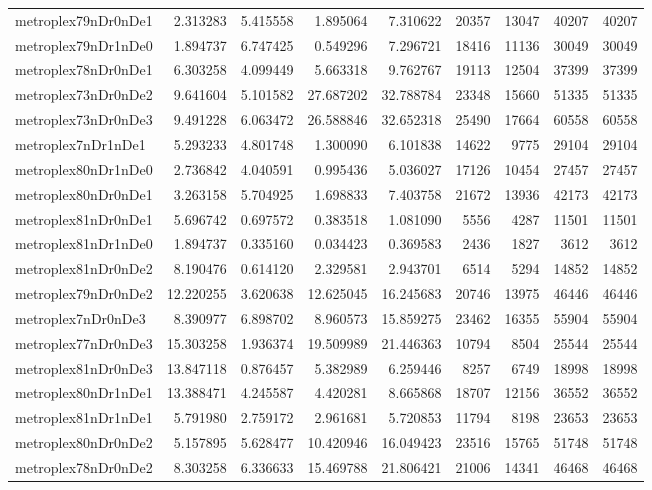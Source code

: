 \begin{longtable}{|l|r|r|r|r|r|r|r|r|}
metroplex79nDr0nDe1 & 2.313283 & 5.415558 & 1.895064 & 7.310622 & 20357 & 13047 & 40207 & 40207 \\
metroplex79nDr1nDe0 & 1.894737 & 6.747425 & 0.549296 & 7.296721 & 18416 & 11136 & 30049 & 30049 \\
metroplex78nDr0nDe1 & 6.303258 & 4.099449 & 5.663318 & 9.762767 & 19113 & 12504 & 37399 & 37399 \\
metroplex73nDr0nDe2 & 9.641604 & 5.101582 & 27.687202 & 32.788784 & 23348 & 15660 & 51335 & 51335 \\
metroplex73nDr0nDe3 & 9.491228 & 6.063472 & 26.588846 & 32.652318 & 25490 & 17664 & 60558 & 60558 \\
metroplex7nDr1nDe1 & 5.293233 & 4.801748 & 1.300090 & 6.101838 & 14622 & 9775 & 29104 & 29104 \\
metroplex80nDr1nDe0 & 2.736842 & 4.040591 & 0.995436 & 5.036027 & 17126 & 10454 & 27457 & 27457 \\
metroplex80nDr0nDe1 & 3.263158 & 5.704925 & 1.698833 & 7.403758 & 21672 & 13936 & 42173 & 42173 \\
metroplex81nDr0nDe1 & 5.696742 & 0.697572 & 0.383518 & 1.081090 & 5556 & 4287 & 11501 & 11501 \\
metroplex81nDr1nDe0 & 1.894737 & 0.335160 & 0.034423 & 0.369583 & 2436 & 1827 & 3612 & 3612 \\
metroplex81nDr0nDe2 & 8.190476 & 0.614120 & 2.329581 & 2.943701 & 6514 & 5294 & 14852 & 14852 \\
metroplex79nDr0nDe2 & 12.220255 & 3.620638 & 12.625045 & 16.245683 & 20746 & 13975 & 46446 & 46446 \\
metroplex7nDr0nDe3 & 8.390977 & 6.898702 & 8.960573 & 15.859275 & 23462 & 16355 & 55904 & 55904 \\
metroplex77nDr0nDe3 & 15.303258 & 1.936374 & 19.509989 & 21.446363 & 10794 & 8504 & 25544 & 25544 \\
metroplex81nDr0nDe3 & 13.847118 & 0.876457 & 5.382989 & 6.259446 & 8257 & 6749 & 18998 & 18998 \\
metroplex80nDr1nDe1 & 13.388471 & 4.245587 & 4.420281 & 8.665868 & 18707 & 12156 & 36552 & 36552 \\
metroplex81nDr1nDe1 & 5.791980 & 2.759172 & 2.961681 & 5.720853 & 11794 & 8198 & 23653 & 23653 \\
metroplex80nDr0nDe2 & 5.157895 & 5.628477 & 10.420946 & 16.049423 & 23516 & 15765 & 51748 & 51748 \\
metroplex78nDr0nDe2 & 8.303258 & 6.336633 & 15.469788 & 21.806421 & 21006 & 14341 & 46468 & 46468 \\

\end{longtable}
